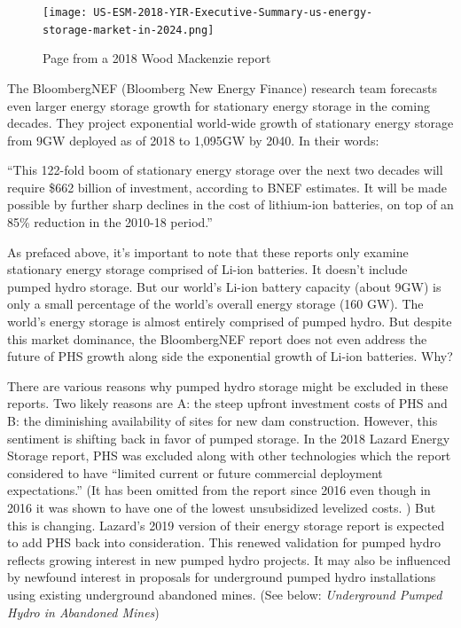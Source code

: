 \documentclass[hidelinks,12pt,a4paper]{article}
\begin{document}
\begin{figure}[ht!]
    \centering
    \texttt{[image: US-ESM-2018-YIR-Executive-Summary-us-energy-storage-market-in-2024.png]}
    \caption{Page from a 2018 Wood Mackenzie report \cite{USEnergyStorageMonitor2018YIRAndQ12019}}
\end{figure}
\FloatBarrier

The BloombergNEF (Bloomberg New Energy Finance) research team forecasts even larger energy storage growth for stationary energy storage in the coming decades. They project exponential world-wide growth of stationary energy storage from 9GW deployed as of 2018 to 1,095GW by 2040. In their words:

\begin{displayquote}
“This 122-fold boom of stationary energy storage over the next two decades will require \$662 billion of investment, according to BNEF estimates. It will be made possible by further sharp declines in the cost of lithium-ion batteries, on top of an 85\% reduction in the 2010-18 period.” \cite{EnergyStorageInvestmentsBoom}
\end{displayquote}

As prefaced above, it's important to note that these reports only examine stationary energy storage comprised of Li-ion batteries. It doesn't include pumped hydro storage. But our world's Li-ion battery capacity (about 9GW) is only a small percentage of the world's overall energy storage (160 GW). \cite{ElectricityAndEnergyStorageWorldNuclearAssociation} The world's energy storage is almost entirely comprised of pumped hydro. But despite this market dominance, the BloombergNEF report does not even address the future of PHS growth along side the exponential growth of Li-ion batteries. Why?

There are various reasons why pumped hydro storage might be excluded in these reports. Two likely reasons are A: the steep upfront investment costs of PHS and B: the diminishing availability of sites for new dam construction. However, this sentiment is shifting back in favor of pumped storage. In the 2018 Lazard Energy Storage report, PHS was excluded along with other technologies which the report considered to have “limited current or future commercial deployment expectations.” \cite{LazardsLevelizedCostOfStorageAnalysis2018Version4} (It has been omitted from the report since 2016 even though in 2016 it was shown to have one of the lowest unsubsidized levelized costs. \cite{LazardsLevelizedCostOfStorageAnalysis2016Version2}) But this is changing. Lazard's 2019 version of their energy storage report is expected to add PHS back into consideration. \cite{PumpedEnergyStorageVitalToCalifornia} This renewed validation for pumped hydro reflects growing interest in new pumped hydro projects. It may also be influenced by newfound interest in proposals for underground pumped hydro installations using existing underground abandoned mines. (See below: \textit{Underground Pumped Hydro in Abandoned Mines})
\end{document}
